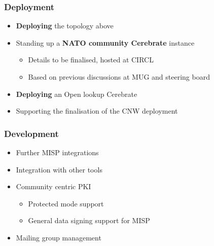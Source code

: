 \begin{frame}
\frametitle{Deployment}
    \begin{itemize}
        \item \textbf{Deploying} the topology above
        \item Standing up a {\bf NATO community Cerebrate} instance
            \begin{itemize}
            	\item Details to be finalised, hosted at CIRCL
            	\item Based on previous discussions at MUG and steering board
            \end{itemize}
        \item \textbf{Deploying} an Open lookup Cerebrate 
        \item Supporting the finalisation of the CNW deployment
    \end{itemize}
\end{frame}

\begin{frame}
\frametitle{Development}
    \begin{itemize}
        \item Further MISP integrations
        \item Integration with other tools
        \item Community centric PKI
        \begin{itemize}
            \item Protected mode support
            \item General data signing support for MISP
        \end{itemize}
        \item Mailing group management
    \end{itemize}
\end{frame}


